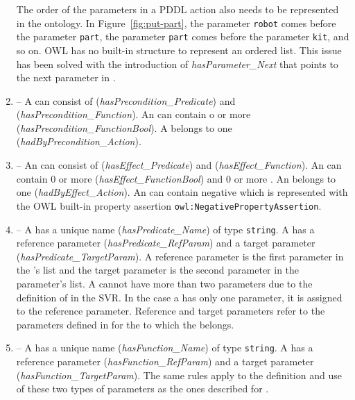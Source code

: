 \begin{enumerate}
    The order of the parameters in a PDDL action also needs to be represented in the ontology. In Figure~\ref{fig:put-part}, the parameter \texttt{robot} comes before the parameter \texttt{part}, the parameter \texttt{part} comes before the parameter \texttt{kit}, and so on. OWL has no built-in structure to represent an ordered list. This issue has been solved with the introduction of \emph{hasParameter\_Next} that points to the next parameter in .
\item {} -- A  can consist of  (\emph{hasPrecondition\_Predicate}) and  (\emph{hasPrecondition\_Function}). An  can contain o or more  (\emph{hasPrecondition\_FunctionBool}). A  belongs to one  (\emph{hadByPrecondition\_Action}).
\item {} -- An  can consist of  (\emph{hasEffect\_Predicate}) and  (\emph{hasEffect\_Function}). An  can contain 0 or more  (\emph{hasEffect\_FunctionBool}) and 0 or more . An  belongs to one  (\emph{hadByEffect\_Action}). An  can contain negative  which is represented with the OWL built-in property assertion \texttt{owl:NegativePropertyAssertion}.
\item {} -- A  has a unique name (\emph{hasPredicate\_Name}) of type \texttt{string}. A  has a reference parameter (\emph{hasPredicate\_RefParam}) and a target parameter (\emph{hasPredicate\_TargetParam}). A reference parameter is the first parameter in the 's list and the target parameter is the second parameter in the parameter's list. A  cannot have more than two parameters due to the definition of  in the SVR. In the case a  has only one parameter, it is assigned to the reference parameter. Reference and target parameters refer to the parameters defined in  for the  to which the  belongs.
\item {} -- A  has a unique name (\emph{hasFunction\_Name}) of type \texttt{string}. A  has a reference parameter (\emph{hasFunction\_RefParam}) and a target parameter (\emph{hasFunction\_TargetParam}). The same rules apply to the definition and use of these two types of parameters as the ones described for .

\end{enumerate}

